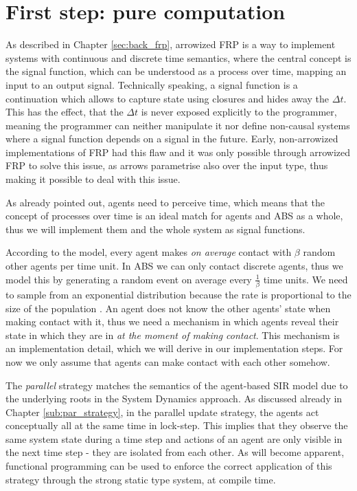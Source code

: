 \section{First step: pure computation}
\label{sec:timedriven_firststep}
As described in Chapter \ref{sec:back_frp}, arrowized FRP \cite{hughes_generalising_2000} is a way to implement systems with continuous and discrete time semantics, where the central concept is the signal function, which can be understood as a process over time, mapping an input to an output signal. Technically speaking, a signal function is a continuation which allows to capture state using closures and hides away the $\Delta t$. This has the effect, that the $\Delta t$ is never exposed explicitly to the programmer, meaning the programmer can neither manipulate it nor define non-causal systems where a signal function depends on a signal in the future. Early, non-arrowized implementations of FRP had this flaw and it was only possible through arrowized FRP to solve this issue, as arrows parametrise also over the input type, thus making it possible to deal with this issue.

As already pointed out, agents need to perceive time, which means that the concept of processes over time is an ideal match for agents and ABS as a whole, thus we will implement them and the whole system as signal functions.

According to the model, every agent makes \textit{on average} contact with $\beta$ random other agents per time unit. In ABS we can only contact discrete agents, thus we model this by generating a random event on average every $\frac{1}{\beta}$ time units. We need to sample from an exponential distribution because the rate is proportional to the size of the population \cite{borshchev_system_2004}. An agent does not know the other agents' state when making contact with it, thus we need a mechanism in which agents reveal their state in which they are in \textit{at the moment of making contact}. This mechanism is an implementation detail, which we will derive in our implementation steps. For now we only assume that agents can make contact with each other somehow.

The \textit{parallel} strategy matches the semantics of the agent-based SIR model due to the underlying roots in the System Dynamics approach. As discussed already in Chapter \ref{sub:par_strategy}, in the parallel update strategy, the agents act conceptually all at the same time in lock-step. This implies that they observe the same system state during a time step and actions of an agent are only visible in the next time step - they are isolated from each other. As will become apparent, functional programming can be used to enforce the correct application of this strategy through the strong static type system, at compile time.


